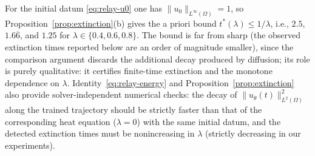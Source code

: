 \documentclass[11pt]{elsarticle}
\theoremstyle{definition}
\theoremstyle{remark}
\numberwithin{equation}{section}
\begin{document}
For the initial datum \eqref{eq:relay-u0} one has
$\|u_0\|_{L^\infty(\Omega)}=1$, so Proposition~\ref{prop:extinction}(b)
gives the a priori bound $t^*(\lambda)\le1/\lambda$, i.e., $2.5$, $1.6\overline{6}$,
and $1.25$ for $\lambda\in\{0.4,0.6,0.8\}$. The bound is far from sharp
(the observed extinction times reported below are an order of magnitude
smaller), since the comparison argument discards the additional decay
produced by diffusion; its role is purely qualitative: it certifies
finite-time extinction and the monotone dependence on $\lambda$.
Identity~\eqref{eq:relay-energy} and
Proposition~\ref{prop:extinction} also provide solver-independent
numerical checks: the decay of $\|u_\theta(t)\|_{L^2(\Omega)}^2$ along the
trained trajectory should be strictly faster than that of the corresponding
heat equation ($\lambda=0$) with the same initial datum, and the detected
extinction times must be nonincreasing in $\lambda$ (strictly decreasing in
our experiments).
\end{document}
